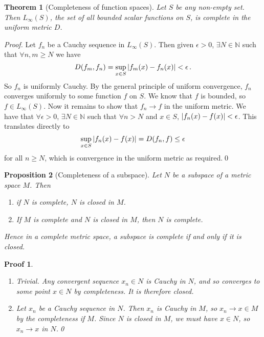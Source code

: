\documentclass{article}
\theoremstyle{plain}\theoremheaderfont{\normalfont\itshape}\theorembodyfont{\rmfamily}\theoremseparator{.}\newtheorem*{rem}{Remark}\newtheorem*{ex}{Example}\newtheorem*{proof}{Proof}\newtheorem*{altp}{Alternative proof}
\theoremstyle{plain}\theoremheaderfont{\normalfont\bfseries}\theorembodyfont{\rmfamily}\theoremseparator{.}\newtheorem{thm}{Theorem}[section]\newtheorem{lem}[thm]{Lemma}\newtheorem{prop}[thm]{Proposition}\newtheorem*{cor}{Corollary}\newtheorem{defn}[thm]{Definition}\newtheorem{clm}[thm]{Claim}\newtheorem{clminproof}{Claim}
\theoremstyle{break}\theoremheaderfont{\normalfont\itshape}\theorembodyfont{\rmfamily}\theoremseparator{.\medskip}\newtheorem*{proofskip}{Proof}\newtheorem*{exs}{Examples}\newtheorem*{rems}{Remarks}
\theoremstyle{break}\theoremheaderfont{\normalfont\bfseries}\theorembodyfont{\rmfamily}\theoremseparator{.\medskip}\newtheorem{lemskip}[thm]{Lemma}\newtheorem{defnskip}[thm]{Definition}\newtheorem{propskip}[thm]{Proposition}\newtheorem{thmskip}[thm]{Theorem}
\newcommand{\qed}{\hfill\ensuremath{\Box}}
\begin{document}
    \begin{thm}[Completeness of function spaces]
        Let \(S\) be any non-empty set. Then \(L_\infty(S)\), the set of all bounded scalar functions on \(S\), is complete in the uniform metric \(D\).
    \end{thm}
    \begin{proof}
        Let \(f_n\) be a Cauchy sequence in \(L_\infty(S)\). Then given \(\epsilon>0\), \(\exists N\in\mathbb{N}\) such that \(\forall n,m\ge N\) we have
        \[D(f_m,f_n)=\sup_{x\in S}\abs{f_m(x)-f_n(x)}<\epsilon\,.\]
        So \(f_n\) is uniformly Cauchy. By the general principle of uniform convergence, \(f_n\) converges uniformly to some function \(f\) on \(S\). We know that \(f\) is bounded, so \(f\in L_\infty(S)\). Now it remains to show that \(f_n\to f\) in the uniform metric. We have that \(\forall\epsilon>0\), \(\exists N\in\mathbb{N}\) such that \(\forall n>N\) and \(x\in S\), \(\abs{f_n(x)-f(x)}<\epsilon\). This translates directly to
        \[\sup_{x\in S}\abs{f_n(x)-f(x)}=D(f_n,f)\le\epsilon\]
        for all \(n\ge N\), which is convergence in the uniform metric as required.\qed
    \end{proof}

    \begin{prop}[Completeness of a subspace]
        Let \(N\) be a subspace of a metric space \(M\). Then
        \begin{enumerate}[label=(\roman*),topsep=0pt]
            \item if \(N\) is complete, \(N\) is closed in \(M\).
            \item If \(M\) is complete and \(N\) is closed in \(M\), then \(N\) is complete.
        \end{enumerate}
        Hence in a complete metric space, a subspace is complete if and only if it is closed.
    \end{prop}
    \begin{proofskip}
        \begin{enumerate}[label=(\roman*),topsep=0pt]
            \item Trivial. Any convergent sequence \(x_n\in N\) is Cauchy in \(N\), and so converges to some point \(x\in N\) by completeness. It is therefore closed.
            \item Let \(x_n\) be a Cauchy sequence in \(N\). Then \(x_n\) is Cauchy in \(M\), so \(x_n\to x\in M\) by the completeness if \(M\). Since \(N\) is closed in \(M\), we must have \(x\in N\), so \(x_n\to x\) in \(N\).\qed
        \end{enumerate}
    \end{proofskip}
\end{document}
